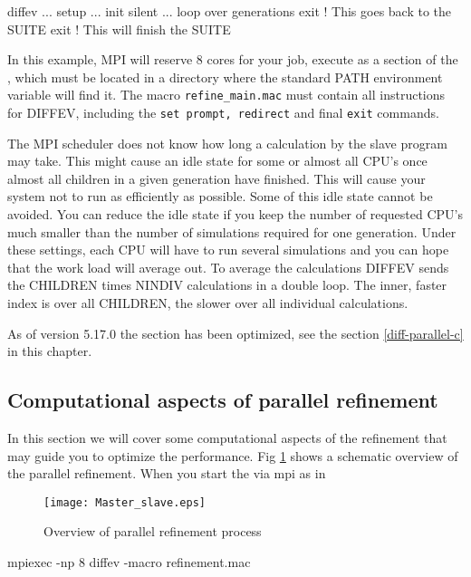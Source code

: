 \begin{MacVerbatim}
diffev
... setup
... init silent
... loop over generations
exit   ! This goes back to the SUITE
exit   ! This will finish the SUITE
\end{MacVerbatim}


In this example, MPI will reserve 8 cores for your job, execute \Diffev 
as a section of the \Suite, which 
must be located in a directory where the standard PATH environment variable will 
find it. The macro {\tt refine\_main.mac} must contain all instructions 
for DIFFEV, including the {\tt set prompt, redirect} and final {\tt exit} 
commands.

The MPI scheduler does not know how long a calculation by the slave program
may take. This might cause an idle state for some or almost all CPU's once 
almost all children in a given generation have finished. This will cause 
your system not to run as efficiently as possible. Some of this idle state
cannot be avoided. You can reduce the idle state if you keep the number of 
requested CPU's much smaller than the number of simulations required for
one generation. Under these settings, each CPU will have to run several 
simulations and you can hope that the work load will average out. To average
the calculations DIFFEV sends the CHILDREN times NINDIV calculations in
a double loop. The inner, faster index is over all CHILDREN, the slower over 
all individual calculations.

As of version 5.17.0 the \Diffev section has been optimized, see the 
section \ref{diff-parallel-c} in this chapter.

\subsection{Computational aspects of parallel refinement \label{diff-parallel-c}}

In this section we will cover some computational aspects of the refinement
that may guide you to optimize the performance. Fig \ref{fevo-over} shows a
schematic overview of the parallel refinement. When you start the \Suite
via mpi as in

\begin{figure}
   \texttt{[image: Master\_slave.eps]}
   \caption{Overview of parallel refinement process }
   \label{fevo-over}
\end{figure}

\begin{MacVerbatim}
   mpiexec -np 8 diffev -macro refinement.mac
\end{MacVerbatim}

